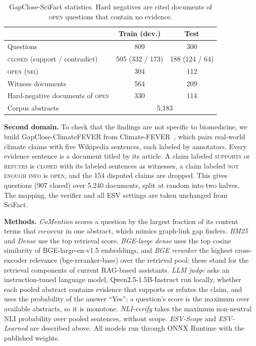 \documentclass[conference,a4paper]{IEEEtran}
\theoremstyle{definition}
\newcommand{\open}{\textup{\textsc{open}}}
\newcommand{\closed}{\textup{\textsc{closed}}}
\begin{document}
\begin{table}[t]
\centering
\caption{GapClose-SciFact statistics. Hard negatives are cited documents of \open{} questions that contain no evidence.}
\label{tab:bench}
\begin{tabular}{lcc}
\toprule
 & Train (dev.) & Test \\
\midrule
Questions & 809 & 300 \\
\quad \closed{} (support / contradict) & 505 (332 / 173) & 188 (124 / 64) \\
\quad \open{} (\textsc{nei}) & 304 & 112 \\
Witness documents & 564 & 209 \\
Hard-negative documents of \open{} & 330 & 114 \\
Corpus abstracts & \multicolumn{2}{c}{5,183} \\
\bottomrule
\end{tabular}
\end{table}

\textbf{Second domain.} To check that the findings are not specific to biomedicine, we build GapClose-ClimateFEVER from Climate-FEVER~\cite{diggelmann2020}, which pairs real-world climate claims with five Wikipedia sentences, each labeled by annotators. Every evidence sentence is a document titled by its article. A claim labeled \textsc{supports} or \textsc{refutes} is \closed{} with its labeled sentences as witnesses, a claim labeled \textsc{not enough info} is \open{}, and the 154 disputed claims are dropped. This gives \ClimN{} questions (907 closed) over 5,240 documents, split at random into two halves. The mapping, the verifier and all ESV settings are taken unchanged from SciFact.

\textbf{Methods.} \emph{CoMention} scores a question by the largest fraction of its content terms that co-occur in one abstract, which mimics graph-link gap finders. \emph{BM25} and \emph{Dense} use the top retrieval score. \emph{BGE-large dense} uses the top cosine similarity of BGE-large-en-v1.5 embeddings, and \emph{BGE reranker} the highest cross-encoder relevance (bge-reranker-base) over the retrieval pool; these stand for the retrieval components of current RAG-based assistants. \emph{LLM judge} asks an instruction-tuned language model, Qwen2.5-1.5B-Instruct run locally, whether each pooled abstract contains evidence that supports or refutes the claim, and uses the probability of the answer ``Yes''; a question's score is the maximum over available abstracts, so it is monotone. \emph{NLI-verify} takes the maximum non-neutral NLI probability over pooled sentences, without scope. \emph{ESV-Scope} and \emph{ESV-Learned} are described above. All models run through ONNX Runtime with the published weights.
\end{document}

